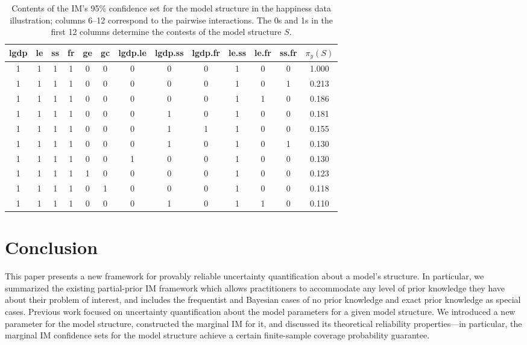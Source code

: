 \documentclass[12pt]{article}
\begin{document}
\begin{table}[t]
\begin{center}
\begin{tabular}{ccccccccccccc}
\hline
lgdp & le & ss & fr & ge & gc & lgdp.le & lgdp.ss & lgdp.fr & le.ss & le.fr & ss.fr & $\pi_y(S)$ \\
\hline 
1 & 1 & 1 & 1 & 0 & 0 & 0 & 0 & 0 & 1 & 0 & 0 & 1.000 \\
1 & 1 & 1 & 1 & 0 & 0 & 0 & 0 & 0 & 1 & 0 & 1 & 0.213 \\
1 & 1 & 1 & 1 & 0 & 0 & 0 & 0 & 0 & 1 & 1 & 0 & 0.186 \\
1 & 1 & 1 & 1 & 0 & 0 & 0 & 1 & 0 & 1 & 0 & 0 & 0.181 \\
1 & 1 & 1 & 1 & 0 & 0 & 0 & 1 & 1 & 1 & 0 & 0 & 0.155 \\
1 & 1 & 1 & 1 & 0 & 0 & 0 & 1 & 0 & 1 & 0 & 1 & 0.130 \\
1 & 1 & 1 & 1 & 0 & 0 & 1 & 0 & 0 & 1 & 0 & 0 & 0.130 \\
1 & 1 & 1 & 1 & 1 & 0 & 0 & 0 & 0 & 1 & 0 & 0 & 0.123 \\
1 & 1 & 1 & 1 & 0 & 1 & 0 & 0 & 0 & 1 & 0 & 0 & 0.118 \\
1 & 1 & 1 & 1 & 0 & 0 & 0 & 1 & 0 & 1 & 1 & 0 & 0.110 \\
\hline 
\end{tabular}
\end{center}
\caption{Contents of the IM's 95\% confidence set for the model structure in the happiness data illustration; columns 6--12 correspond to the pairwise interactions.  The 0s and 1s in the first 12 columns determine the contests of the model structure $S$.}
\label{table:happy}
\end{table}

\section{Conclusion} 
\label{sec:conclusion}

This paper presents a new framework for provably reliable uncertainty quantification about a model's structure. In particular, we summarized the existing partial-prior IM framework which allows practitioners to accommodate any level of prior knowledge they have about their problem of interest, and includes the frequentist and Bayesian cases of no prior knowledge and exact prior knowledge as special cases. Previous work focused on uncertainty quantification about the model parameters for a given model structure. We introduced a new parameter for the model structure, constructed the marginal IM for it, and discussed its theoretical reliability properties---in particular, the marginal IM confidence sets for the model structure achieve a certain finite-sample coverage probability guarantee. 
\end{document}
